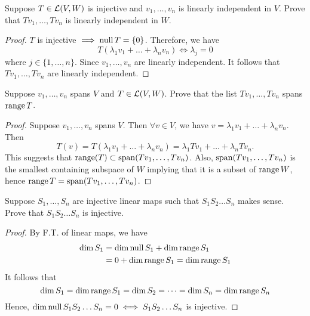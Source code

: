 


\begin{exercise}
Suppose \(T \in \mathcal{L} (V,W)\) is injective and \(v_1, \dots, v_n\) is linearly independent in $V$. Prove that \(Tv_1, \dots, Tv_n\) is linearly independent in $W$.
\end{exercise}

\begin{proof}
	$T$ is injective $\implies \mathop{\mathrm{null}} T = \{0\}$.
	Therefore, we have \[
		T(\lambda_1 v_1 + \dots + \lambda_nv_n) \iff \lambda_j = 0\]
	where $j \in \{1, \dots, n\}$. Since \(v_1, \dots, v_n\) are linearly independent. It follows that \(Tv_1, \dots, Tv_n\) are linearly independent.
\end{proof}

\begin{exercise}
Suppose \(v_1, \dots, v_n\) spans $V$ and \(T \in \mathcal{L}(V,W)\). Prove that the list \(Tv_1, \dots, Tv_n\) spans $\mathop{\mathrm{range}} T$.
\end{exercise}

\begin{proof}
	Suppose \(v_1, \dots, v_n\) spans $V$. Then \(\forall v \in V\), we have \(v = \lambda_1 v_1 + \dots + \lambda_n v_n\). Then \[
		T(v) = T(\lambda_1 v_1 + \dots + \lambda_n v_n) = \lambda_1 Tv_1 + \dots + \lambda_n Tv_n.\]
	This suggests that \(\mathop{\mathrm{range}}(T) \subset \mathop{\mathrm{span}} (Tv_1, \dots, Tv_n)\). Also, $\mathop{\mathrm{span}} (Tv_1, \dots, Tv_n)$ is the smallest containing subspace of $W$ implying that it is a subset of $\mathop{\mathrm{range}} W$, hence \(\mathop{\mathrm{range}} T = \mathop{\mathrm{span}} (Tv_1, \dots, Tv_n)\).
\end{proof}

\begin{exercise}
Suppose $S_1, \dots, S_n$ are injective linear maps such that $S_1 S_2 \dots S_n$ makes sense. Prove that \(S_1 S_2 \dots S_n\) is injective.
\end{exercise}

\begin{proof}
	By F.T. of linear maps, we have
	\begin{align*}
		\dim S_1 & = \dim \mathop{\mathrm{null}} S_1 + \dim \mathop{\mathrm{range}} S_1      \\
		         & = 0 + \dim \mathop{\mathrm{range}} S_1 = \dim \mathop{\mathrm{range}} S_1
	\end{align*}
	It follows that \[
		\dim S_1 = \dim \mathop{\mathrm{range}} S_1 = \dim S_2 = \dots = \dim S_n = \dim \mathop{\mathrm{range}} S_n\]
	Hence, $\dim \mathop{\mathrm{null}} S_1 S_2 \dots S_n = 0 \iff S_1 S_2 \dots S_n$ is injective.
\end{proof}

